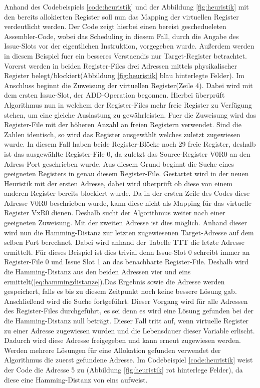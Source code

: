Anhand des Codebeispiels \ref{code:heuristik} und der Abbildung \ref{fig:heuristik} mit den bereits allokierten Register soll nun das Mapping der virtuellen Register verdeutlicht werden.
Der Code zeigt hierbei einen bereist geschedueleten Assembler-Code, wobei das Scheduling in diesem Fall, durch die Angabe des Issue-Slots vor der eigentlichen Instruktion, vorgegeben wurde. Außerdem werden in diesem Beispiel fuer ein besseres Verstaendis nur Target-Register betrachtet.
Vorerst werden in beiden Register-Files drei Adressen mittels physikalischer Register belegt/blockiert(Abbildung \ref{fig:heuristik} blau hinterlegte Felder). Im Anschluss beginnt die Zuweisung der virtuellen Register(Zeile 4).
Dabei wird mit dem ersten Issue-Slot, der ADD-Operation begonnen. Hierbei  überprüft Algorithmus nun in welchem der Register-Files mehr freie Register zu Verfügung stehen, um eine gleiche Auslastung zu gewährleisten. Fuer die Zuweisung wird das Register-File mit der höheren Anzahl an freien Registern verwendet. Sind die Zahlen identisch, so wird das Register ausgewählt welches zuletzt zugewiesen wurde. In diesem Fall haben beide Register-Blöcke noch 29 freie Register, deshalb ist das ausgewählte Register-File 0, da zuletzt das Source-Register V0R0 an den Adress-Port geschrieben wurde.
Aus diesem Grund beginnt die Suche eines geeigneten Registers in genau diesem Register-File. Gestartet wird in der neuen Heuristik mit der ersten Adresse, dabei wird überprüft ob diese von einem anderen Register bereits blockiert wurde. Da in der ersten Zeile des Codes diese Adresse V0R0 beschrieben wurde, kann diese nicht als Mapping für das virtuelle Register VxR0 dienen. Deshalb sucht der Algorithmus weiter nach einer geeigneten Zuweisung. Mit der zweiten Adresse ist dies möglich. Anhand dieser wird nun die Hamming-Distanz zur letzten zugewiesenen Target-Adresse auf dem selben Port berechnet. Dabei wird anhand der Tabelle TTT die letzte Adresse ermittelt. Für dieses Beispiel ist dies trivial denn Issue-Slot 0 schreibt immer an Register-File 0 und Issue Slot 1 an das benachbarte Register-File. Deshalb wird die Hamming-Distanz aus den beiden Adressen vier und eins ermittelt(\ref{eq:hammingdistanze}).Das Ergebnis sowie die Adresse werden gespeichert, falls es bis zu diesem Zeitpunkt noch keine bessere Lösung gab. Anschließend wird die Suche fortgeführt. Dieser Vorgang wird für alle Adressen des Register-Files durchgeführt, es sei denn es wird eine Lösung gefunden bei der die Hamming-Distanz null beträgt. Dieser Fall tritt auf, wenn virtuelle Register zu einer Adresse zugewiesen wurden und die Lebensdauer dieser Variable erlischt. Dadurch wird diese Adresse freigegeben und kann erneut zugewiesen werden.  Werden mehrere Lösungen für eine Allokation gefunden verwendet der Algorithmus die zuerst gefundene Adresse. Im Codebeispiel \ref{code:heuristik} weist der Code die Adresse 5 zu (Abbildung \ref{fig:heuristik} rot hinterlege Felder), da diese eine Hamming-Distanz von eins aufweist.
